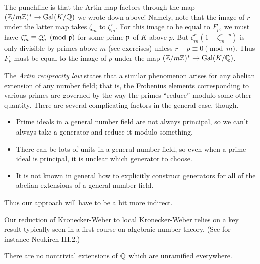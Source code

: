 The punchline is that the Artin map factors through the map $(\mathbb{Z}/m\mathbb{Z})^*
\to \operatorname{Gal}(K/\mathbb{Q})$ we wrote down above! Namely, note that the image of $r$
under the latter map takes $\zeta_m$ to $\zeta_m^r$. For this image to
be equal to $F_p$, we must have $\zeta_m^r \equiv \zeta_m^p \pmod{\mathfrak{p}}$
for some prime $\mathfrak{p}$ of $K$ above $p$. But $\zeta_m^r (1 - \zeta_m^{r-p})$
is only divisible by primes above $m$ (see exercises) unless $r-p \equiv 0
\pmod{m}$. Thus $F_p$ must be equal to the image of $p$ under the map
$(\mathbb{Z}/m\mathbb{Z})^* \to \operatorname{Gal}(K/\mathbb{Q})$.

The \emph{Artin reciprocity law} states that a similar phenomenon arises
for any abelian extension of any number field; that is, the Frobenius elements
corresponding to various primes are governed by the way the primes ``reduce''
modulo some other quantity. There are several complicating factors in the
general case, though.
\begin{itemize}
\item Prime ideals in a general number field are not always principal, so we
can't always take a generator and reduce it modulo something.
\item There can be lots of units in a general number field, so even when
a prime ideal is principal, it is unclear which generator to choose.
\item It is not known in general how to explicitly construct generators
for all of the abelian extensions of a general number field.
\end{itemize}
Thus our approach will have to be a bit more indirect.


Our reduction of Kronecker-Weber to local Kronecker-Weber relies on
a key result typically seen in a first course on algebraic number theory. (See for instance Neukirch III.2.)
\begin{theorem}[Minkowski] \label{T:Minkowski}
There are no nontrivial extensions of $\mathbb{Q}$ which are unramified everywhere.
\end{theorem}


